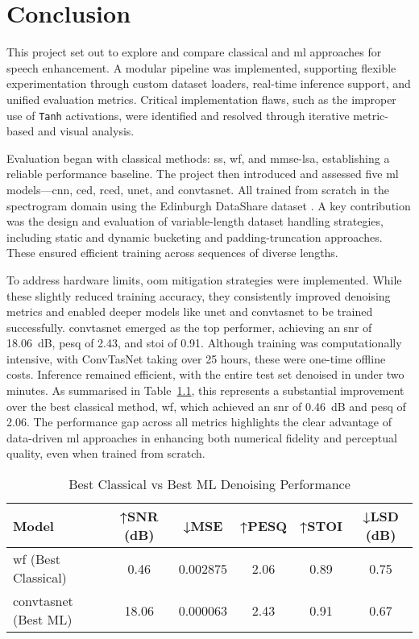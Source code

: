 \chapter{Conclusion}
\label{chp:conclusion}

This project set out to explore and compare classical and \gls{ml} approaches for speech enhancement. A modular pipeline was implemented, supporting flexible experimentation through custom dataset loaders, real-time inference support, and unified evaluation metrics. Critical implementation flaws, such as the improper use of \texttt{Tanh} activations, were identified and resolved through iterative metric-based and visual analysis.

Evaluation began with classical methods: \gls{ss}, \gls{wf}, and \gls{mmse-lsa}, establishing a reliable performance baseline. The project then introduced and assessed five \gls{ml} models—\gls{cnn}, \gls{ced}, \gls{rced}, \gls{unet}, and \gls{convtasnet}. All trained from scratch in the spectrogram domain using the Edinburgh DataShare dataset \cite{edinburghdataset}. A key contribution was the design and evaluation of variable-length dataset handling strategies, including static and dynamic bucketing and padding-truncation approaches. These ensured efficient training across sequences of diverse lengths.

To address hardware limits, \gls{oom} mitigation strategies were implemented. While these slightly reduced training accuracy, they consistently improved denoising metrics and enabled deeper models like \gls{unet} and \gls{convtasnet} to be trained successfully. \gls{convtasnet} emerged as the top performer, achieving an \gls{snr} of 18.06~dB, \gls{pesq} of 2.43, and \gls{stoi} of 0.91. Although training was computationally intensive, with ConvTasNet taking over 25 hours, these were one-time offline costs. Inference remained efficient, with the entire test set denoised in under two minutes. As summarised in Table~\ref{tab:summary_comparison}, this represents a substantial improvement over the best classical method, \gls{wf}, which achieved an \gls{snr} of 0.46~dB and \gls{pesq} of 2.06. The performance gap across all metrics highlights the clear advantage of data-driven \gls{ml} approaches in enhancing both numerical fidelity and perceptual quality, even when trained from scratch.

\vspace{1em}
\begin{table}[H]
\centering
\caption{Best Classical vs Best ML Denoising Performance}
\label{tab:summary_comparison}
\begin{tabular}{|l|c|c|c|c|c|}
\hline
\textbf{Model} & \textbf{↑SNR (dB)} & \textbf{↓MSE} & \textbf{↑PESQ} & \textbf{↑STOI} & \textbf{↓LSD (dB)} \\
\hline
\gls{wf} (Best Classical) & 0.46 & 0.002875 & 2.06 & 0.89 & 0.75 \\
\gls{convtasnet} (Best ML) & 18.06 & 0.000063 & 2.43 & 0.91 & 0.67 \\
\hline
\end{tabular}
\end{table}
\vspace{1em}

